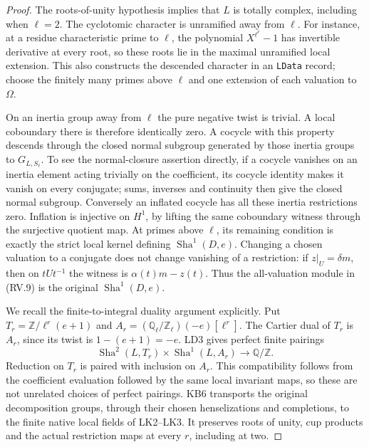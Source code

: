 \begin{proof}
The roots-of-unity hypothesis implies that $L$ is totally complex,
including when $\ell=2$.
The cyclotomic character is unramified away from $\ell$.
For instance, at a residue characteristic prime to $\ell$, the
polynomial $X^{\ell^r}-1$ has invertible derivative at every root,
so these roots lie in the maximal unramified local extension.
This also constructs the descended character in an \texttt{LData}
record; choose the finitely many primes above $\ell$ and one
extension of each valuation to $\Omega$.

On an inertia group away from $\ell$ the pure negative twist is
trivial.  A local coboundary there is therefore identically zero.
A cocycle with this property descends through the closed normal
subgroup generated by those inertia groups to $G_{L,S_\ell}$.
To see the normal-closure assertion directly, if a cocycle vanishes
on an inertia element acting trivially on the coefficient, its
cocycle identity makes it vanish on every conjugate; sums, inverses
and continuity then give the closed normal subgroup.
Conversely an inflated cocycle has all these inertia restrictions
zero.  Inflation is injective on $H^1$, by lifting the same
coboundary witness through the surjective quotient map.
At primes above $\ell$, its remaining condition is exactly the
strict local kernel defining $\operatorname{Sha}^1(D,e)$.
Changing a chosen valuation to a conjugate does not change vanishing
of a restriction: if $z|_U=\delta m$, then on $tUt^{-1}$ the
witness is $\alpha(t)m-z(t)$.
Thus the all-valuation module in (RV.9) is the original
$\operatorname{Sha}^1(D,e)$.

We recall the finite-to-integral duality argument explicitly.
Put $T_r=\mathbb Z/\ell^r(e+1)$ and
$A_r=(\mathbb Q_\ell/\mathbb Z_\ell)(-e)[\ell^r]$.
The Cartier dual of $T_r$ is $A_r$, since its twist is
$1-(e+1)=-e$.
LD3 gives perfect finite pairings
\[
 \operatorname{Sha}^2(L,T_r)\times
       \operatorname{Sha}^1(L,A_r)\longrightarrow\mathbb Q/\mathbb Z.
 \tag{RV.11}
\]
Reduction on $T_r$ is paired with inclusion on $A_r$.
This compatibility follows from the coefficient evaluation followed
by the same local invariant maps, so these are not unrelated choices
of perfect pairings.
KB6 transports the original decomposition groups, through their
chosen henselizations and completions, to the finite native local
fields of LK2--LK3.  It preserves roots of unity, cup products and
the actual restriction maps at every $r$, including at two.


\end{proof}
